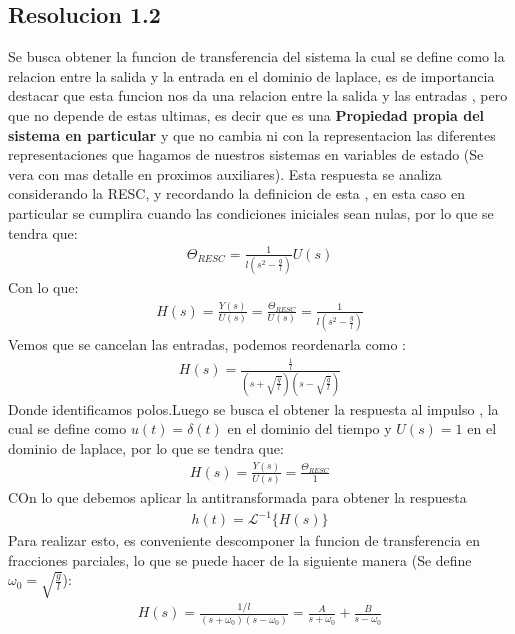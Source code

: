 \documentclass[
  11pt,
  letterpaper,
   addpoints,
   answers
  ]{exam}
\begin{document}
\begin{questions}
\begin{solution}
        \subsection*{Resolucion 1.2}
        Se busca obtener la funcion de transferencia del sistema la cual se define como la relacion entre la salida y la entrada en el dominio de laplace, es de importancia destacar que esta funcion nos da una relacion entre la salida y las entradas , pero que no depende de estas ultimas, es decir que es una \textbf{Propiedad propia del sistema en particular} y que no cambia ni con la representacion las diferentes representaciones que hagamos de nuestros sistemas en variables de estado (Se vera con mas detalle en proximos auxiliares). Esta respuesta se analiza considerando la RESC, y recordando la definicion de esta , en esta caso en particular se cumplira cuando las condiciones iniciales sean nulas, por lo que se tendra que:
        \begin{align}
            \Theta_{RESC} = \frac{1}{l(s^{2}-\frac{g}{l})}U(s)
        \end{align}
        Con lo que:
        \begin{align}
            H(s) = \frac{Y(s)}{U(s)} = \frac{\Theta_{RESC}}{U(s)} = \frac{1}{l(s^{2}-\frac{g}{l})} 
        \end{align}
        Vemos que se cancelan las entradas, podemos reordenarla como :
        \begin{align}
            H(s) = \frac{\frac{1}{l}}{(s+\sqrt{\frac{g}{l}})(s-\sqrt{\frac{g}{l}})}
        \end{align}
        Donde identificamos polos.Luego se busca el obtener la respuesta al impulso , la cual se define como $u(t) = \delta(t)$ en el dominio del tiempo y $U(s) = 1$ en el dominio de laplace, por lo que se tendra que:
        \begin{align}
            H(s) = \frac{Y(s)}{U(s)}=\frac{\Theta_{RESC}}{1}
        \end{align}
        COn lo que debemos aplicar la antitransformada para obtener la respuesta
        \begin{align}
            h(t)= \mathcal{L}^{-1}\{H(s)\}
        \end{align}
        Para realizar esto, es conveniente descomponer la funcion de transferencia en fracciones parciales, lo que se puede hacer de la siguiente manera (Se define $\omega_{0} = \sqrt{\frac{g}{l}}$):
        \begin{align}
            H(s) = \frac{1/l}{(s+\omega_{0})(s-\omega_{0})} = \frac{A}{s+\omega_{0}} + \frac{B}{s-\omega_{0}}

\end{align}
\end{solution}
\end{questions}
\end{document}
